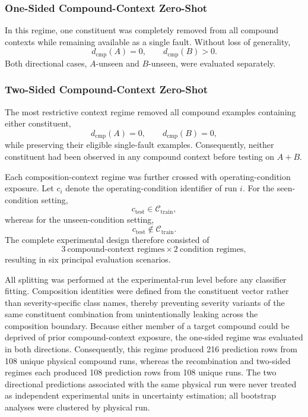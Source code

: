 \subsubsection{One-Sided Compound-Context Zero-Shot}
In this regime, one constituent was completely removed from all compound
contexts while remaining available as a single fault. Without loss of
generality,
\begin{equation}
d_{\mathrm{cmp}}(A) = 0, \qquad d_{\mathrm{cmp}}(B) > 0.
\end{equation}
Both directional cases, $A$-unseen and $B$-unseen, were evaluated
separately.

\subsubsection{Two-Sided Compound-Context Zero-Shot}
The most restrictive context regime removed all compound examples
containing either constituent,
\begin{equation}
d_{\mathrm{cmp}}(A) = 0, \qquad d_{\mathrm{cmp}}(B) = 0,
\end{equation}
while preserving their eligible single-fault examples. Consequently,
neither constituent had been observed in any compound context before
testing on $A{+}B$.

Each composition-context regime was further crossed with operating-condition
exposure. Let $c_i$ denote the operating-condition identifier of run $i$.
For the seen-condition setting,
\begin{equation}
c_{\mathrm{test}} \in \mathcal{C}_{\mathrm{train}},
\end{equation}
whereas for the unseen-condition setting,
\begin{equation}
c_{\mathrm{test}} \notin \mathcal{C}_{\mathrm{train}}.
\end{equation}
The complete experimental design therefore consisted of
\begin{equation}
3 \ \text{compound-context regimes} \times 2 \ \text{condition regimes},
\end{equation}
resulting in six principal evaluation scenarios.

All splitting was performed at the experimental-run level before any
classifier fitting. Composition identities were defined from the
constituent vector rather than severity-specific class names, thereby
preventing severity variants of the same constituent combination from
unintentionally leaking across the composition boundary. Because either
member of a target compound could be deprived of prior compound-context
exposure, the one-sided regime was evaluated in both directions.
Consequently, this regime produced 216 prediction rows from 108 unique
physical compound runs, whereas the recombination and two-sided regimes
each produced 108 prediction rows from 108 unique runs. The two directional
predictions associated with the same physical run were never treated as
independent experimental units in uncertainty estimation; all bootstrap
analyses were clustered by physical run.

